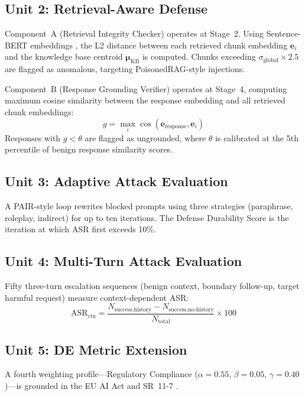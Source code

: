 \documentclass[journal,10pt]{IEEEtran}
\begin{document}
\subsection{Unit 2: Retrieval-Aware Defense}

Component~A (Retrieval Integrity Checker) operates at Stage~2. Using Sentence-BERT embeddings \cite{reimers2019sentence}, the L2 distance between each retrieved chunk embedding $\mathbf{e}_i$ and the knowledge base centroid $\boldsymbol{\mu}_\text{KB}$ is computed. Chunks exceeding $\sigma_\text{global} \times 2.5$ are flagged as anomalous, targeting PoisonedRAG-style \cite{zou2025poisonedrag} injections.

Component~B (Response Grounding Verifier) operates at Stage~4, computing maximum cosine similarity between the response embedding and all retrieved chunk embeddings:
\begin{equation}
g = \max_{i} \cos(\mathbf{e}_\text{response}, \mathbf{e}_i)
\label{eq:grounding}
\end{equation}
Responses with $g < \theta$ are flagged as ungrounded, where $\theta$ is calibrated at the 5th percentile of benign response similarity scores.

\subsection{Unit 3: Adaptive Attack Evaluation}

A PAIR-style \cite{chao2023jailbreaking} loop rewrites blocked prompts using three strategies (paraphrase, roleplay, indirect) for up to ten iterations. The Defense Durability Score is the iteration at which ASR first exceeds 10\%.

\subsection{Unit 4: Multi-Turn Attack Evaluation}

Fifty three-turn escalation sequences (benign context, boundary follow-up, target harmful request) measure context-dependent ASR:
\begin{equation}
\text{ASR}_\text{ctx} = \frac{N_\text{success,history} - N_\text{success,no-history}}{N_\text{total}} \times 100
\end{equation}

\subsection{Unit 5: DE Metric Extension}

A fourth weighting profile---Regulatory Compliance ($\alpha\!=\!0.55$, $\beta\!=\!0.05$, $\gamma\!=\!0.40$)---is grounded in the EU AI Act \cite{euaiact2024} and SR~11-7 \cite{federalreserve2011sr}.


\end{document}
